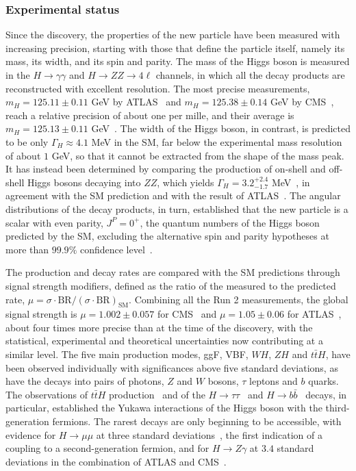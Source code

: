 \subsubsection{Experimental status}
%
Since the discovery, the properties of the new particle have been measured with increasing precision, starting with those that define the particle itself, namely its mass, its width, and its spin and parity. The mass of the Higgs boson is measured in the $H\to\gamma\gamma$ and $H\to ZZ\to4\ell$ channels, in which all the decay products are reconstructed with excellent resolution. The most precise measurements, $m_H = 125.11 \pm 0.11$ GeV by ATLAS~\cite{ATLAS:2023oaq} and $m_H = 125.38 \pm 0.14$ GeV by CMS~\cite{CMS:2020xrn}, reach a relative precision of about one per mille, and their average is $m_H = 125.13 \pm 0.11$ GeV~\cite{ParticleDataGroup:2026mpi}. The width of the Higgs boson, in contrast, is predicted to be only $\Gamma_H \approx 4.1$ MeV in the SM, far below the experimental mass resolution of about $1$ GeV, so that it cannot be extracted from the shape of the mass peak. It has instead been determined by comparing the production of on-shell and off-shell Higgs bosons decaying into $ZZ$, which yields $\Gamma_H = 3.2^{+2.4}_{-1.7}$ MeV~\cite{CMS:2022ley}, in agreement with the SM prediction and with the result of ATLAS~\cite{ATLAS:2023dnm}. The angular distributions of the decay products, in turn, established that the new particle is a scalar with even parity, $J^P = 0^+$, the quantum numbers of the Higgs boson predicted by the SM, excluding the alternative spin and parity hypotheses at more than $99.9\%$ confidence level~\cite{CMS:2014nkk,ATLAS:2015zhl}.

The production and decay rates are compared with the SM predictions through signal strength modifiers, defined as the ratio of the measured to the predicted rate, $\mu = \sigma\cdot\mathrm{BR}/(\sigma\cdot\mathrm{BR})_{\text{SM}}$. Combining all the Run 2 measurements, the global signal strength is $\mu = 1.002 \pm 0.057$ for CMS~\cite{CMS:2022dwd} and $\mu = 1.05 \pm 0.06$ for ATLAS~\cite{ATLAS:2022vkf}, about four times more precise than at the time of the discovery, with the statistical, experimental and theoretical uncertainties now contributing at a similar level. The five main production modes, ggF, VBF, $WH$, $ZH$ and $t\bar{t}H$, have been observed individually with significances above five standard deviations, as have the decays into pairs of photons, $Z$ and $W$ bosons, $\tau$ leptons and $b$ quarks. The observations of $t\bar{t}H$ production~\cite{CMS:2018uxb,ATLAS:2018mme} and of the $H\to\tau\tau$~\cite{CMS-HIG-16-043} and $H\to b\bar{b}$~\cite{CMS:2018nsn,ATLAS:2018kot} decays, in particular, established the Yukawa interactions of the Higgs boson with the third-generation fermions. The rarest decays are only beginning to be accessible, with evidence for $H\to\mu\mu$ at three standard deviations~\cite{CMS:2020xwi}, the first indication of a coupling to a second-generation fermion, and for $H\to Z\gamma$ at $3.4$ standard deviations in the combination of ATLAS and CMS~\cite{ATLAS:2023yqk}.


